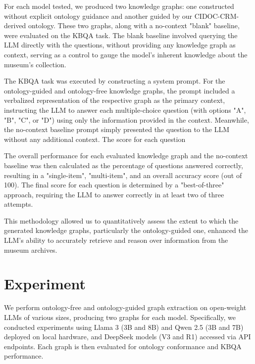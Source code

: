\documentclass[a4, conference]{IEEEtran}
\begin{document}
For each model tested, we produced two knowledge graphs: one constructed without explicit ontology guidance and another guided by our CIDOC-CRM-derived ontology. These two graphs, along with a no-context "blank" baseline, were evaluated on the KBQA task. The blank baseline involved querying the LLM directly with the questions, without providing any knowledge graph as context, serving as a control to gauge the model's inherent knowledge about the museum's collection.

The KBQA task was executed by constructing a system prompt. For the ontology-guided and ontology-free knowledge graphs, the prompt included a verbalized representation of the respective graph as the primary context, instructing the LLM to answer each multiple-choice question (with options "A", "B", "C", or "D") using only the information provided in the context. Meanwhile, the no-context baseline prompt simply presented the question to the LLM without any additional context. The score for each question

The overall performance for each evaluated knowledge graph and the no-context baseline was then calculated as the percentage of questions answered correctly, resulting in a "single-item", "multi-item", and an overall accuracy score (out of 100). The final score for each question is determined by a "best-of-three" approach, requiring the LLM to answer correctly in at least two of three attempts.

This methodology allowed us to quantitatively assess the extent to which the generated knowledge graphs, particularly the ontology-guided one, enhanced the LLM's ability to accurately retrieve and reason over information from the museum archives.

\section{Experiment}

We perform ontology-free and ontology-guided graph extraction on open-weight LLMs of various sizes, producing two graphs for each model. Specifically, we conducted experiments using Llama 3 \cite{grattafiori2024llama3herdmodels} (3B and 8B) and Qwen 2.5 \cite{qwen2025qwen25technicalreport} (3B and 7B) deployed on local hardware, and DeepSeek \cite{deepseekai2024deepseekv3technicalreport,deepseekai2025deepseekr1incentivizingreasoningcapability} models (V3 and R1) accessed via API endpoints. Each graph is then evaluated for ontology conformance and KBQA performance.
\end{document}
